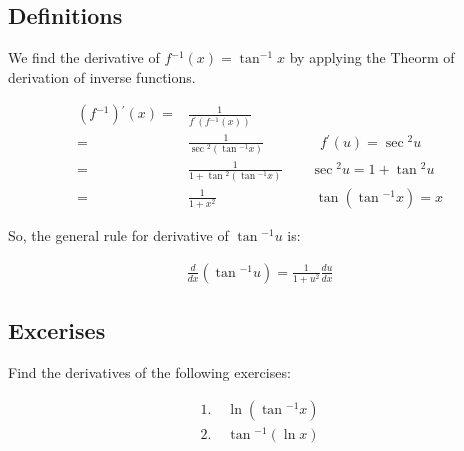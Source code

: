 \documentclass[fleqn]{article}
\begin{document}
\thispagestyle{empty}

\subsection*{Definitions}
\noindent
We find the derivative of $f{^{-1} (x)} = \tan^{-1}{x}$ by applying the Theorm of derivation of inverse functions.
\newline

\begin{align*}
    \left(f{^{-1}}\right){^{\prime}}(x) =& \frac{1}{f{^{\prime} \left(f{^{-1}}(x)\right)}} \\
    =& \frac{1}{\sec{^2 \left(\tan{^{-1}}{x}\right)}} \qquad\qquad f{^{\prime} (u)} = \sec{^2 u} \\
    =& \frac{1}{1 + \tan{^{2} \left(\tan{^{-1} x}\right)}} \qquad \sec{^2 u} = 1 + \tan{^2 u} \\
    =& \frac{1}{1 + x{^2}} \qquad\qquad\qquad\quad  \tan{\left(\tan{^{-1} x}\right)} = x
\end{align*}

\noindent
So, the general rule for derivative of $\tan{^{-1} u}$ is:
\newline

\begin{align*}
    \frac{d}{dx}\left(\tan{^{-1} u}\right) = \frac{1}{1 + u^2}\frac{du}{dx}
\end{align*}

\subsection*{Excerises}
\noindent
Find the derivatives of the following exercises:
\newline

\begin{align*}
1.\;&\ln{\left(\tan{^{-1} x}\right)} \\
2.\;&\tan{^{-1} \left(\ln{x}\right)}
\end{align*}
\end{document}
